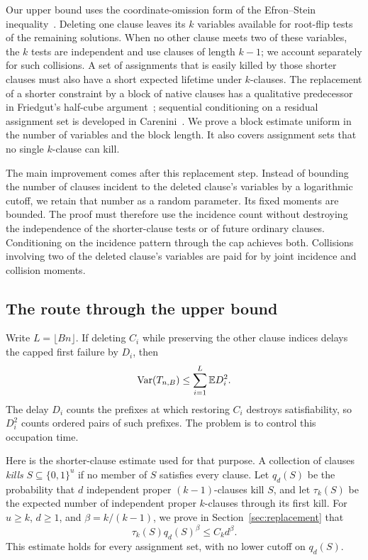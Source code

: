 Our upper bound uses the coordinate-omission form of the Efron--Stein
inequality~\cite{EfronStein,BBLM}. Deleting one clause leaves its $k$
variables available for root-flip tests of the remaining solutions.
When no other clause meets two of these variables, the $k$ tests are
independent and use clauses of length $k-1$; we account separately for
such collisions. A set of assignments that is easily
killed by those shorter clauses must also have a short expected lifetime
under $k$-clauses. The replacement of a shorter constraint by a block of
native clauses has a qualitative predecessor in Friedgut's half-cube
argument~\cite[Lemma~5.7]{Friedgut}; sequential conditioning on a residual
assignment set is developed in Carenini~\cite[Theorem~4.3 and Lemma~6.1]{Carenini}.
We prove a block estimate uniform in the number of variables and the
block length. It also covers assignment sets that no single $k$-clause
can kill.

The main improvement comes after this replacement step. Instead of
bounding the number of clauses incident to the deleted clause's variables
by a logarithmic cutoff, we retain that number as a random parameter.
Its fixed moments are bounded. The proof must therefore use the
incidence count without destroying the independence of the shorter-clause
tests or of future ordinary clauses. Conditioning on the incidence
pattern through the cap achieves both. Collisions involving two of the
deleted clause's variables are paid for by joint incidence and collision
moments.

\subsection{The route through the upper bound}

Write $L=\lfloor Bn\rfloor$. If deleting $C_i$ while preserving the
other clause indices delays the capped first failure by $D_i$, then
\[
 \operatorname{Var}(T_{n,B})\le\sum_{i=1}^{L}\mathbb E D_i^2.
\]
The delay $D_i$ counts the prefixes at which restoring $C_i$ destroys
satisfiability, so $D_i^2$ counts ordered pairs of such prefixes. The
problem is to control this occupation time.

Here is the shorter-clause estimate used for that purpose. A collection
of clauses \emph{kills} $S\subseteq\{0,1\}^u$ if no member of $S$
satisfies every clause. Let $q_d(S)$ be the probability that $d$ independent
proper $(k-1)$-clauses kill $S$, and let $\tau_k(S)$ be the expected
number of independent proper $k$-clauses through its first kill. For
$u\ge k$, $d\ge1$, and $\beta=k/(k-1)$, we prove in
Section~\ref{sec:replacement} that
\[
 \tau_k(S)q_d(S)^\beta\le C_kd^\beta.
\]
This estimate holds for every assignment set, with no lower cutoff on
$q_d(S)$.

